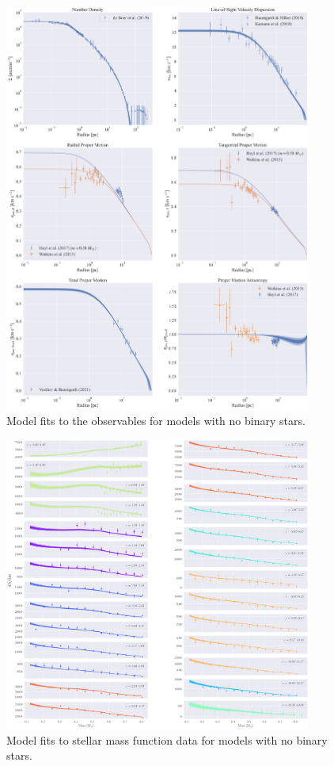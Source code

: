\begin{figure}
	\begin{center}
		\includegraphics[width=0.9\textwidth]{figures/prev_nobin/obs_panel.png}
	\end{center}
	\caption{Model fits to the observables for models with no binary stars.}
	\label{fig:nobin_obs_panel}
\end{figure}

\begin{figure}
	\begin{center}
		\includegraphics[width=0.9\textwidth]{figures/prev_nobin/mass_fun.png}
	\end{center}
	\caption{Model fits to stellar mass function data for models with no binary stars.}
	\label{fig:nobin_mass_fun}
\end{figure}


